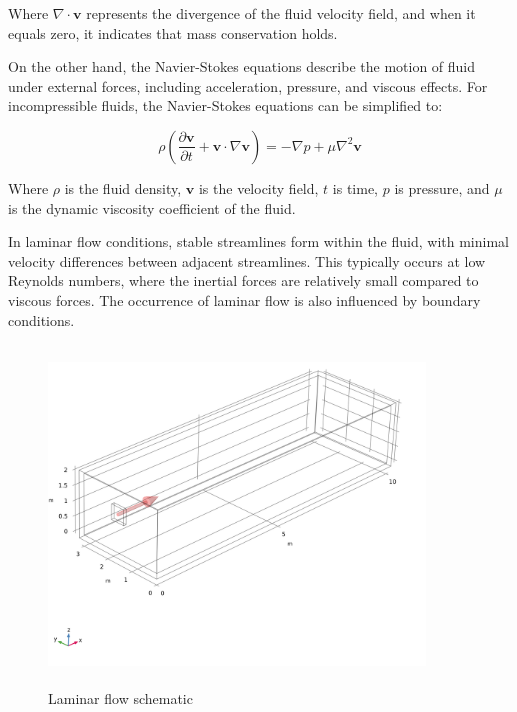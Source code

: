 \documentclass{apmcmthesis}
\begin{document}
Where $\nabla \cdot \mathbf{v}$ represents the divergence of the fluid velocity field, and when it equals zero, it indicates that mass conservation holds.

On the other hand, the Navier-Stokes equations describe the motion of fluid under external forces, including acceleration, pressure, and viscous effects. For incompressible fluids, the Navier-Stokes equations can be simplified to:

\begin{equation}
\rho \left(\frac{\partial \mathbf{v}}{\partial t} + \mathbf{v} \cdot \nabla \mathbf{v}\right) = -\nabla p + \mu \nabla^2 \mathbf{v}
\end{equation}

Where \(\rho\) is the fluid density, \(\mathbf{v}\) is the velocity field, \(t\) is time, \(p\) is pressure, and \(\mu\) is the dynamic viscosity coefficient of the fluid.

In laminar flow conditions, stable streamlines form within the fluid, with minimal velocity differences between adjacent streamlines. This typically occurs at low Reynolds numbers, where the inertial forces are relatively small compared to viscous forces. The occurrence of laminar flow is also influenced by boundary conditions.
\newpage
\begin{figure}[htbp]
  \centering
  \includegraphics[width=10cm,height=9cm]{figures/Laminar flow schematic.png}
  \caption{Laminar flow schematic} %
  \label{Laminar flow schematic}
\end{figure}
\end{document}
